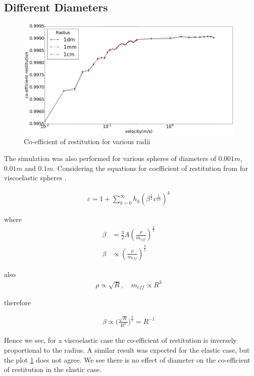 
\subsection{Different Diameters}

\begin{figure}[H]
\includegraphics[width=1.0\textwidth]{../images/parametricStudy/CORvsVELdiffDAI_pdf.pdf}
\caption{Co-efficient of restitution for various radii}
\label{fig:CORDiffDia}
\end{figure}

The simulation was also performed for various spheres of diameters of $0.001m$, $0.01m$ and $0.1m$. Considering the equations for coefficient of restitution from \citep{muller} for viscoelastic spheres .

\begin{align*}
\varepsilon = 1+ \sum_{k=0}^{\infty} h_{k}(\beta^{\frac{1}{2}} v^{\frac{1}{10}})^{k} 
\end{align*}

where
\begin{align*}
\beta &= \frac{3}{2} A (\frac{\rho}{m_{eff}})^{\frac{2}{5}} \\
\beta &\propto (\frac{\rho}{m_{eff}})^{\frac{2}{5}}
\end{align*}

also 
\begin{align*}
\rho \propto \sqrt{R}, \quad m_{eff} \propto R^{3}
\end{align*}

therefore

\begin{align*}
\beta \propto \Big( \frac{\sqrt{R}}{R^{3}} \Big)^{\frac{2}{5}} = R^{-1}
\end{align*}

Hence we see, for a viscoelastic case the co-efficient of restitution is inversely proportional to the radius. A similar result was expected for the elastic case, but the plot \ref{fig:CORDiffDia} does not agree. We see there is no effect of diameter on the co-efficient of restitution in the elastic case.



